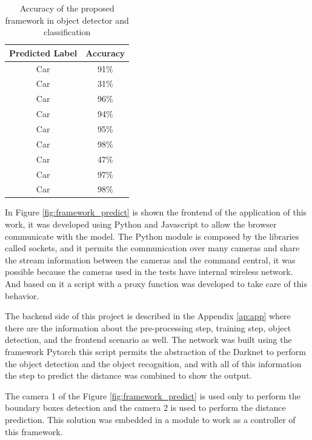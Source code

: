 \begin{table}[H]
\centering
\caption{Accuracy of the proposed framework in object detector and classification}
\begin{tabular}{c|c}
\hline
Predicted Label & Accuracy \\ \hline
Car             & 91\%     \\ \hline
Car             & 31\%     \\ \hline
Car             & 96\%     \\ \hline
Car             & 94\%     \\ \hline
Car             & 95\%     \\ \hline
Car             & 98\%     \\ \hline
Car             & 47\%     \\ \hline
Car             & 97\%     \\ \hline
Car             & 98\%     \\ \hline
\end{tabular}
\label{tab:accuracy}
\end{table}



In Figure \ref{fig:framework_predict} is shown the frontend of the application of this work, it was developed using Python and Javascript to allow the browser communicate with the model. The Python module is composed by the libraries called sockets, and it permits the communication over many cameras and share the stream information between the cameras and the command central, it was possible because the cameras used in the tests have internal wireless network. And based on it a script with a proxy function was developed to take care of this behavior. 

The backend side of this project is described in the Appendix \ref{ap:app} where there are the information about the pre-processing step, training step, object detection, and the frontend scenario as well. The network was built using the framework Pytorch \cite{paszke2019pytorch} this script permits the abstraction of the Darknet to perform the object detection and the object recognition, and with all of this information the step to predict the distance was combined to show the output. 

The camera 1 of the Figure \ref{fig:framework_predict} is used only to perform the boundary boxes detection and the camera 2 is used to perform the distance prediction. This solution was embedded in a module to work as a controller of this framework.

